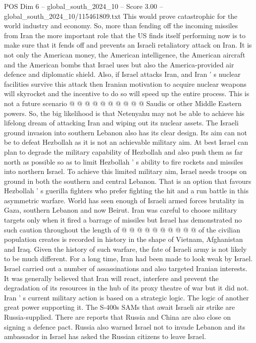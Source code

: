 \begin{textsample}{POS Dim 6 – global\_south\_2024\_10 – Score 3.00 – global\_south\_2024\_10/115461809.txt}
This would prove catastrophic for the world industry and economy.
So, more than fending off the incoming missiles from Iran the more important role that the US finds itself performing now is to make sure that it fends off and prevents an Israeli retaliatory attack on Iran.
It is not only the American money, the American intelligence, the American aircraft and the American bombs that Israel uses but also the America-provided air defence and diplomatic shield.
Also, if Israel attacks Iran, and Iran ' s nuclear facilities survive this attack then Iranian motivation to acquire nuclear weapons will skyrocket and the incentive to do so will speed up the entire process.
This is not a future scenario @ @ @ @ @ @ @ @ @ @ Saudis or other Middle Eastern powers.
So, the big likelihood is that Netenyahu may not be able to achieve his lifelong dream of attacking Iran and wiping out its nuclear assets.
The Israeli ground invasion into southern Lebanon also has its clear design.
Its aim can not be to defeat Hezbollah as it is not an achievable military aim.
At best Israel can plan to degrade the military capability of Hezbollah and also push them as far north as possible so as to limit Hezbollah ' s ability to fire rockets and missiles into northern Israel.
To achieve this limited military aim, Israel needs troops on ground in both the southern and central Lebanon.
That is an option that favours Hezbollah ' s guerilla fighters who prefer fighting the hit and a run battle in this asymmetric warfare.
World has seen enough of Israeli armed forces brutality in Gaza, southern Lebanon and now Beirut.
Iran was careful to choose military targets only when it fired a barrage of missiles but Israel has demonstrated no such caution throughout the length of @ @ @ @ @ @ @ @ @ @ of the civilian population creates is recorded in history in the shape of Vietnam, Afghanistan and Iraq.
Given the history of such warfare, the fate of Israeli army is not likely to be much different.
For a long time, Iran had been made to look weak by Israel.
Israel carried out a number of assassinations and also targeted Iranian interests.
It was generally believed that Iran will react, interfere and prevent the degradation of its resources in the hub of its proxy theatre of war but it did not.
Iran ' s current military action is based on a strategic logic.
The logic of another great power supporting it.
The S-400s SAMs that await Israeli air strike are Russia-supplied.
There are reports that Russia and China are also close on signing a defence pact.
Russia also warned Israel not to invade Lebanon and its ambassador in Israel has asked the Russian citizens to leave Israel.

\end{textsample}
